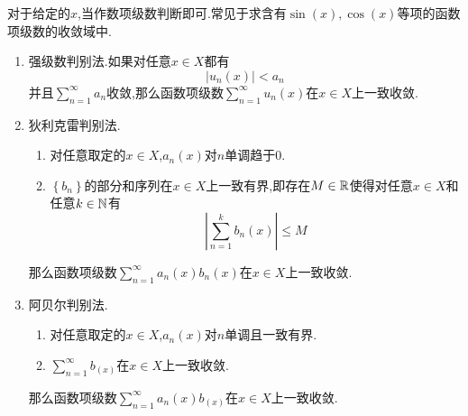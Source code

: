 \documentclass{ctexart}
\begin{document}
\begin{theorem}[判断函数项级数收敛的方法]
    对于给定的$x$,当作数项级数判断即可.常见于求含有$\sin(x),\cos(x)$等项的函数项级数的收敛域中.
\end{theorem}
\begin{theorem}[判断函数项级数一致收敛的方法]
     \begin{enumerate}[label=\tbf{(\arabic*)},topsep=0pt,parsep=0pt,itemsep=0pt,partopsep=0pt]
        \item 强级数判别法.如果对任意$x\in X$都有
            \[\left|u_n(x)\right|<a_n\]
            并且$\displaystyle\sum_{n=1}^{\infty}a_n$收敛,那么函数项级数$\displaystyle\sum_{n=1}^{\infty}u_n(x)$在$x\in X$上一致收敛.
        \item 狄利克雷判别法.
            \begin{enumerate}[label=\tbf{\roman*.},topsep=0pt,parsep=0pt,itemsep=0pt,partopsep=0pt]
                \item 对任意取定的$x\in X$,$a_n(x)$对$n$单调趋于$0$.
                \item $\left\{b_n\right\}$的部分和序列在$x\in X$上一致有界,即存在$M\in\mathbb{R}$使得对任意$x\in X$和任意$k\in\mathbb{N}$有
                    \[\left|\sum_{n=1}^{k}b_n(x)\right|\leqslant M\]
            \end{enumerate}
            那么函数项级数$\displaystyle\sum_{n=1}^{\infty}a_n(x)b_n(x)$在$x\in X$上一致收敛.
        \item 阿贝尔判别法.
            \begin{enumerate}[label=\tbf{\roman*.},topsep=0pt,parsep=0pt,itemsep=0pt,partopsep=0pt]
                \item 对任意取定的$x\in X$,$a_n(x)$对$n$单调且一致有界.
                \item $\displaystyle\sum_{n=1}^{\infty}b_(x)$在$x\in X$上一致收敛.
            \end{enumerate}
            那么函数项级数$\displaystyle\sum_{n=1}^{\infty}a_n(x)b_(x)$在$x\in X$上一致收敛.
    \end{enumerate}
\end{theorem}
\end{document}
